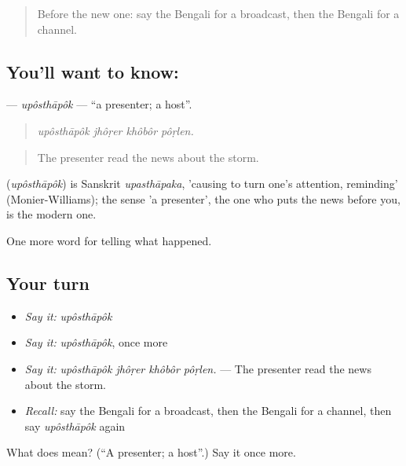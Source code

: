 \begin{quote}
Before the new one: say the Bengali for a broadcast, then the Bengali for a channel.
\end{quote}

\subsection*{You'll want to know: }
\textbf{} — \emph{upôsthāpôk} — \textquotedblleft{}a presenter; a host\textquotedblright{}.

\begin{quote}
   
\end{quote}

\begin{quote}
\emph{upôsthāpôk jhôṛer khôbôr pôṛlen.}
\end{quote}

\begin{quote}
The presenter read the news about the storm.
\end{quote}

\begin{cousinweb}
\textbf{} (\emph{upôsthāpôk}) is Sanskrit \emph{upasthāpaka}, 'causing to turn one's attention, reminding' (Monier-Williams); the sense 'a presenter', the one who puts the news before you, is the modern one.
\end{cousinweb}

\begin{grammarlens}[title={What you've built}]
One more word for telling what happened.
\end{grammarlens}

\subsection*{Your turn}
\begin{itemize}
\raggedright
  \item \emph{Say it:} \emph{upôsthāpôk}
  \item \emph{Say it:} \emph{upôsthāpôk}, once more
  \item \emph{Say it:} \emph{upôsthāpôk jhôṛer khôbôr pôṛlen.} — The presenter read the news about the storm.
  \item \emph{Recall:} say the Bengali for a broadcast, then the Bengali for a channel, then say \emph{upôsthāpôk} again
\end{itemize}

\begin{tcolorbox}[breakable,colback=teal!4,colframe=teal!35!black,title={Before you move on}]
What does  mean? (\textquotedblleft{}A presenter; a host\textquotedblright{}.) Say it once more.
\end{tcolorbox}
